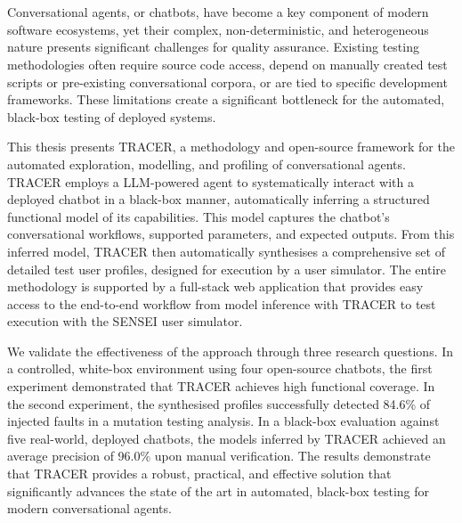\chapter{\abstractname}

Conversational agents, or chatbots,
have become a key component of modern software ecosystems,
yet their complex, non-deterministic, and heterogeneous nature
presents significant challenges for quality assurance.
Existing testing methodologies
often require source code access,
depend on manually created test scripts or pre-existing conversational corpora,
or are tied to specific development frameworks.
These limitations create a significant bottleneck
for the automated, black-box testing of deployed systems.

This thesis presents \acf{TRACER},
a methodology and open-source framework
for the automated exploration, modelling, and profiling of conversational agents.
\ac{TRACER} employs a \ac{LLM}-powered agent
to systematically interact with a deployed chatbot in a black-box manner,
automatically inferring a structured functional model of its capabilities.
This model captures the chatbot's
conversational workflows, supported parameters, and expected outputs.
From this inferred model,
\ac{TRACER} then automatically synthesises
a comprehensive set of detailed test user profiles,
designed for execution by a user simulator.
The entire methodology is supported by a full-stack web application
that provides easy access to the end-to-end workflow
from model inference with \ac{TRACER} to test execution with the SENSEI user simulator.

We validate the effectiveness of the approach through three research questions.
In a controlled, white-box environment using four open-source chatbots,
the first experiment demonstrated that \ac{TRACER} achieves high functional coverage.
In the second experiment,
the synthesised profiles successfully detected 84.6\% of injected faults in a mutation testing analysis.
In a black-box evaluation against five real-world, deployed chatbots,
the models inferred by \ac{TRACER} achieved an average precision of 96.0\% upon manual verification.
The results demonstrate that \ac{TRACER} provides a robust, practical, and effective solution
that significantly advances the state of the art in automated, black-box testing for modern conversational agents.
